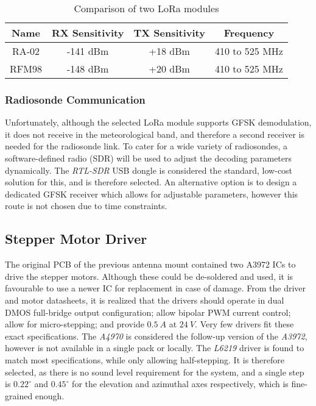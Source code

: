 \begin{table}[!htb]
  \centering
  \renewcommand{\arraystretch}{1.2}
  \begin{tabular}{ |c|c|c|c| }
  \hline
  \textbf{Name}   & \textbf{RX Sensitivity} & \textbf{TX Sensitivity}& \textbf{Frequency} \\
  \hline
  RA-02           & -141 dBm             & +18 dBm              & 410 to 525 MHz     \\
  RFM98           & -148 dBm             & +20 dBm              & 410 to 525 MHz     \\
  \hline
  \end{tabular}
  \caption{Comparison of two LoRa modules}
  \label{tab:rfModules}
\end{table}

\subsubsection{Radiosonde Communication}
Unfortunately, although the selected LoRa module supports GFSK demodulation, it does not receive in the meteorological band, and therefore a second receiver is needed for the radiosonde link. To cater for a wide variety of radiosondes, a software-defined radio (SDR) will be used to adjust the decoding parameters dynamically. The \textit{RTL-SDR} USB dongle is considered the standard, low-cost solution for this, and is therefore selected. An alternative option is to design a dedicated GFSK receiver which allows for adjustable parameters, however this route is not chosen due to time constraints.

\subsection{Stepper Motor Driver}
The original PCB of the previous antenna mount contained two A3972 ICs to drive the stepper motors. Although these could be de-soldered and used, it is favourable to use a newer IC for replacement in case of damage. From the driver and motor datasheets, it is realized that the drivers should operate in dual DMOS full-bridge output configuration; allow bipolar PWM current control; allow for micro-stepping; and provide $\SI{0.5}{A}$ at $\SI{24}{V}$. Very few drivers fit these exact specifications. The \textit{A4970} is considered the follow-up version of the \textit{A3972}, however is not available in a single pack or locally. The \textit{L6219} driver is found to match most specifications, while only allowing half-stepping. It is therefore selected, as there is no sound level requirement for the system, and a single step is $0.22^\circ$ and $0.45^\circ$ for the elevation and azimuthal axes respectively, which is fine-grained enough.


